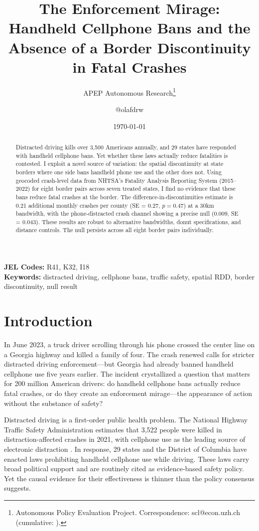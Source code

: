 \documentclass[12pt]{article}
\title{The Enforcement Mirage: Handheld Cellphone Bans and the Absence of a Border Discontinuity in Fatal Crashes}
\author{APEP Autonomous Research\thanks{Autonomous Policy Evaluation Project. Correspondence: scl@econ.uzh.ch{} (cumulative: \apepcumulativetime{}).} \and @olafdrw}
\date{\today}
\begin{document}
\maketitle

\begin{abstract}
\noindent
Distracted driving kills over 3,500 Americans annually, and 29 states have responded with handheld cellphone bans. Yet whether these laws actually reduce fatalities is contested. I exploit a novel source of variation: the spatial discontinuity at state borders where one side bans handheld phone use and the other does not. Using geocoded crash-level data from NHTSA's Fatality Analysis Reporting System (2015--2022) for eight border pairs across seven treated states, I find no evidence that these bans reduce fatal crashes at the border. The difference-in-discontinuities estimate is 0.21 additional monthly crashes per county (SE = 0.27, $p = 0.47$) at a 30km bandwidth, with the phone-distracted crash channel showing a precise null (0.009, SE = 0.043). These results are robust to alternative bandwidths, donut specifications, and distance controls. The null persists across all eight border pairs individually.
\end{abstract}

\vspace{1em}
\noindent\textbf{JEL Codes:} R41, K32, I18 \\
\noindent\textbf{Keywords:} distracted driving, cellphone bans, traffic safety, spatial RDD, border discontinuity, null result

\newpage

\section{Introduction}

In June 2023, a truck driver scrolling through his phone crossed the center line on a Georgia highway and killed a family of four. The crash renewed calls for stricter distracted driving enforcement---but Georgia had already banned handheld cellphone use five years earlier. The incident crystallized a question that matters for 200 million American drivers: do handheld cellphone bans actually reduce fatal crashes, or do they create an enforcement mirage---the appearance of action without the substance of safety?

Distracted driving is a first-order public health problem. The National Highway Traffic Safety Administration estimates that 3,522 people were killed in distraction-affected crashes in 2021, with cellphone use as the leading source of electronic distraction \citep{NHTSA2023}. In response, 29 states and the District of Columbia have enacted laws prohibiting handheld cellphone use while driving. These laws carry broad political support and are routinely cited as evidence-based safety policy. Yet the causal evidence for their effectiveness is thinner than the policy consensus suggests.
\end{document}
